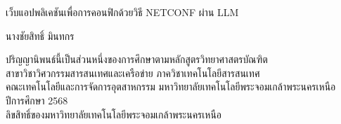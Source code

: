 \newpage
\thispagestyle{empty}
\begin{center}


เว็บแอปพลิเคชันเพื่อการคอนฟิกด้วยวิธี NETCONF ผ่าน LLM      %


\vspace{90mm}
นางชัยสิทธิ์ มินทกร %
\vspace{94mm}   



ปริญญานิพนธ์นี้เป็นส่วนหนึ่งของการศึกษาตามหลักสูตรวิทยาศาสตรบัณฑิต\\
สาขาวิชาวิศวกรรมสารสนเทศและเครือข่าย ภาควิชาเทคโนโลยีสารสนเทศ\\



คณะเทคโนโลยีและการจัดการอุตสาหกรรม มหาวิทยาลัยเทคโนโลยีพระจอมเกล้าพระนครเหนือ\\
ปีการศึกษา 2568\\
ลิขสิทธิ์ของมหาวิทยาลัยเทคโนโลยีพระจอมเกล้าพระนครเหนือ

\end{center}


